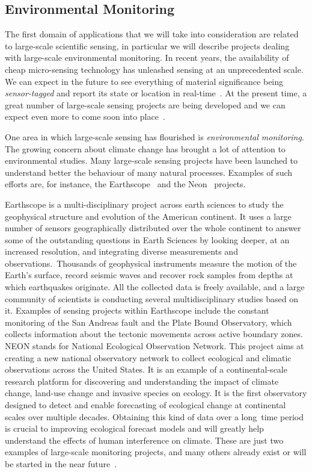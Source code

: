 \subsection*{Environmental Monitoring}
\label{envmon}
The first domain of applications that we will take into consideration are related to large-scale
scientific sensing, in particular we will describe projects dealing with large-scale environmental
monitoring.  In recent years, the availability of cheap micro-sensing technology has unleashed sensing
at an unprecedented scale. We can expect in the future to see everything of material significance being \emph{sensor-tagged} and report its state or location in
real-time~\cite{irisnet,qpsn,stream-processing-challanges}. At the present time, a great number of
large-scale sensing projects are being developed and we can expect even more to come soon into
place~\cite{earthscope,neon,casa-lead,swissexp}.

One area in which large-scale sensing has flourished is \emph{environmental monitoring}. The growing
concern about climate change has brought a lot of attention to environmental studies. Many
large-scale sensing projects have been launched to understand better the behaviour of many natural
processes.
Examples of such efforts are, for instance, the Earthscope~\cite{earthscope} and the Neon~\cite{neon}
projects.

Earthscope is a multi-disciplinary project across earth sciences to study the geophysical structure and
evolution of the American continent. It uses a large number of sensors geographically distributed over
the whole continent to answer some of the outstanding questions in Earth Sciences by looking deeper, at
an increased resolution, and integrating diverse measurements and observations.~Thousands of geophysical
instruments measure the motion of the Earth's surface, record seismic waves and recover rock samples from
depths at which earthquakes originate. All the collected data is freely available, and a large community
of scientists is conducting several multidisciplinary studies based on it. Examples of sensing
projects within Earthscope include the constant monitoring of the San Andreas fault and the Plate Bound
Observatory, which collects information about the tectonic movements across active boundary zones.
NEON stands for National Ecological Observation Network. This project aims at creating a new national
observatory network to collect ecological and climatic observations across the United States. It is an
example of a continental-scale research platform for discovering and understanding the impact of climate
change, land-use change and invasive species on ecology. It is the first observatory designed to detect
and enable forecasting of ecological change at continental scales over multiple decades. Obtaining this
kind of data over a \mbox{long time} period is crucial to improving ecological forecast models and will
greatly help understand the effects of human interference on climate. These are just
two examples of large-scale monitoring projects, and many others already exist or will be started in the
near future~\cite{testban,skysurvey,neon,usvo}.

